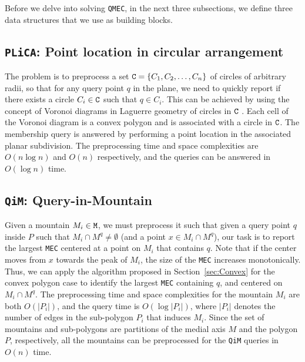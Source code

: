 \documentclass[12pt]{llncs}
\begin{document}
Before we delve into solving {\tt QMEC}, in the next three subsections, we define 
three data structures that we use as building blocks.


\vspace{-0.15in}
\subsection{{\tt PLiCA}: Point location in circular arrangement} \label{sec:plica}
The problem is to preprocess a set 
${\tt C} = \{C_1, C_2, \ldots, C_n\}$ of circles 
of arbitrary radii, so that for any query point $q$ in the plane, we need to 
quickly report if there exists a circle $C_i\in {\tt C}$ such that $q\in C_i$. 
This can be achieved by using the concept of Voronoi diagrams in Laguerre geometry 
of circles in $\tt C$ \cite{IIM}. Each cell of the Voronoi 
diagram is a convex polygon and is associated with a circle in 
${\tt C}$. The membership query is answered by performing a 
point location in the associated planar subdivision. 
The preprocessing time and space complexities are $O(n\log n)$ and 
$O(n)$ respectively, and the queries can be answered in $O(\log n)$ time.

\vspace{-0.15in}
\subsection{{\tt QiM}: Query-in-Mountain}\label{subsec:MiM}
Given a mountain $M_i \in {\tt M}$, we must preprocess it such that given a query point $q$ inside $P$ such that $M_i 
\cap 
M^q \neq \emptyset$ (and a point $x \in M_i 
\cap 
M^q$),
our task is to report the largest {\tt MEC}  centered at a point on $M_i$ that contains 
$q$. 
Note that if the center moves 
from $x$ towards the peak of $M_i$, the size of the 
{\tt MEC} increases monotonically. Thus, we can apply the algorithm proposed in 
Section\ \ref{sec:Convex} for the convex polygon case to identify the largest {\tt MEC}  
containing $q$, and centered on $M_i \cap M^q$. 
The preprocessing time and space complexities for the mountain $M_i$ are both 
$O(|P_i|)$, and the query time is $O(\log |P_i|)$, where $|P_i|$ denotes the 
number of edges in the sub-polygon  $P_i$ that induces $M_i$. Since the 
set of mountains and sub-polygons are partitions of the medial axis $M$ and the 
polygon $P$, respectively, all the 
mountains can be preprocessed for the {\tt QiM} queries in $O(n)$ time. 
\end{document}
